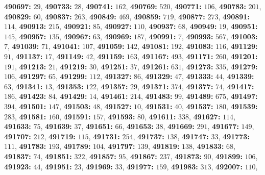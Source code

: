 \textsf{\bfseries 490697:} $29$, \textsf{\bfseries 490733:} $28$, \textsf{\bfseries 490741:} $162$, \textsf{\bfseries 490769:} $520$, \textsf{\bfseries 490771:} $106$, \textsf{\bfseries 490783:} $201$, \textsf{\bfseries 490829:} $60$, \textsf{\bfseries 490837:} $263$, \textsf{\bfseries 490849:} $469$, \textsf{\bfseries 490859:} $719$, \textsf{\bfseries 490877:} $273$, \textsf{\bfseries 490891:} $114$, \textsf{\bfseries 490913:} $215$, \textsf{\bfseries 490921:} $85$, \textsf{\bfseries 490927:} $110$, \textsf{\bfseries 490937:} $68$, \textsf{\bfseries 490949:} $19$, \textsf{\bfseries 490951:} $145$, \textsf{\bfseries 490957:} $135$, \textsf{\bfseries 490967:} $63$, \textsf{\bfseries 490969:} $187$, \textsf{\bfseries 490991:} $7$, \textsf{\bfseries 490993:} $567$, \textsf{\bfseries 491003:} $7$, \textsf{\bfseries 491039:} $71$, \textsf{\bfseries 491041:} $107$, \textsf{\bfseries 491059:} $142$, \textsf{\bfseries 491081:} $192$, \textsf{\bfseries 491083:} $116$, \textsf{\bfseries 491129:} $91$, \textsf{\bfseries 491137:} $17$, \textsf{\bfseries 491149:} $42$, \textsf{\bfseries 491159:} $163$, \textsf{\bfseries 491167:} $493$, \textsf{\bfseries 491171:} $260$, \textsf{\bfseries 491201:} $191$, \textsf{\bfseries 491213:} $21$, \textsf{\bfseries 491219:} $30$, \textsf{\bfseries 491251:} $37$, \textsf{\bfseries 491261:} $631$, \textsf{\bfseries 491273:} $335$, \textsf{\bfseries 491279:} $106$, \textsf{\bfseries 491297:} $65$, \textsf{\bfseries 491299:} $112$, \textsf{\bfseries 491327:} $86$, \textsf{\bfseries 491329:} $47$, \textsf{\bfseries 491333:} $44$, \textsf{\bfseries 491339:} $63$, \textsf{\bfseries 491341:} $13$, \textsf{\bfseries 491353:} $122$, \textsf{\bfseries 491357:} $29$, \textsf{\bfseries 491371:} $374$, \textsf{\bfseries 491377:} $74$, \textsf{\bfseries 491417:} $186$, \textsf{\bfseries 491423:} $84$, \textsf{\bfseries 491429:} $14$, \textsf{\bfseries 491461:} $214$, \textsf{\bfseries 491483:} $99$, \textsf{\bfseries 491489:} $675$, \textsf{\bfseries 491497:} $394$, \textsf{\bfseries 491501:} $147$, \textsf{\bfseries 491503:} $48$, \textsf{\bfseries 491527:} $10$, \textsf{\bfseries 491531:} $40$, \textsf{\bfseries 491537:} $180$, \textsf{\bfseries 491539:} $283$, \textsf{\bfseries 491581:} $160$, \textsf{\bfseries 491591:} $157$, \textsf{\bfseries 491593:} $80$, \textsf{\bfseries 491611:} $338$, \textsf{\bfseries 491627:} $114$, \textsf{\bfseries 491633:} $75$, \textsf{\bfseries 491639:} $37$, \textsf{\bfseries 491651:} $66$, \textsf{\bfseries 491653:} $38$, \textsf{\bfseries 491669:} $291$, \textsf{\bfseries 491677:} $149$, \textsf{\bfseries 491707:} $212$, \textsf{\bfseries 491719:} $115$, \textsf{\bfseries 491731:} $254$, \textsf{\bfseries 491737:} $138$, \textsf{\bfseries 491747:} $33$, \textsf{\bfseries 491773:} $111$, \textsf{\bfseries 491783:} $193$, \textsf{\bfseries 491789:} $104$, \textsf{\bfseries 491797:} $139$, \textsf{\bfseries 491819:} $138$, \textsf{\bfseries 491833:} $68$, \textsf{\bfseries 491837:} $74$, \textsf{\bfseries 491851:} $322$, \textsf{\bfseries 491857:} $95$, \textsf{\bfseries 491867:} $237$, \textsf{\bfseries 491873:} $90$, \textsf{\bfseries 491899:} $106$, \textsf{\bfseries 491923:} $44$, \textsf{\bfseries 491951:} $23$, \textsf{\bfseries 491969:} $33$, \textsf{\bfseries 491977:} $159$, \textsf{\bfseries 491983:} $313$, \textsf{\bfseries 492007:} $110$, 
